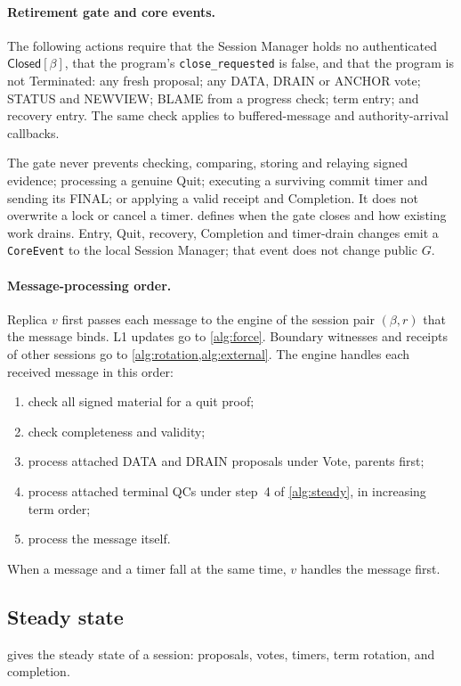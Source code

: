 \documentclass[11pt,a4paper]{article}
\newcommand{\RR}[1]{{\color{rrRed}#1}}
\newcommand{\tagg}[1]{\ensuremath{\mathsf{#1}}}
\begin{document}
\paragraph{Retirement gate and core events.}
The following actions require that the Session Manager holds no
authenticated $\tagg{Closed}[\beta]$, that the program's
\texttt{close\_requested} is false, and that the program is not
Terminated: any fresh proposal; any DATA, DRAIN or ANCHOR vote; STATUS
and NEWVIEW; BLAME from a progress check; term entry; and recovery entry.
The same check applies to buffered-message and authority-arrival
callbacks.

The gate never prevents checking, comparing, storing and relaying signed
evidence; processing a genuine Quit; executing a surviving commit timer
and sending its FINAL; or applying a valid receipt and Completion. It
does not overwrite a lock or cancel a timer. 
defines when the gate closes and how existing work drains. Entry, Quit,
recovery, Completion and timer-drain changes emit a \texttt{CoreEvent} to
the local Session Manager; that event does not change public $G$.

\paragraph{Message-processing order.}\leavevmode
\RR{Replica $v$ first passes each message to the engine of the session
pair $(\beta,r)$ that the message binds. L1 updates go to \cref{alg:force}. Boundary witnesses and receipts of
other sessions go to \cref{alg:rotation,alg:external}.} The engine handles each received
message in this order:
\begin{enumerate}[label=(\arabic*)]
\item check all signed material for a quit proof;
\item check completeness and validity;
\item process attached DATA \RR{and DRAIN} proposals under Vote, parents
first;
\item process attached terminal QCs under step~4 of \cref{alg:steady},
in increasing term order;
\item process the message itself.
\end{enumerate}
When a message and a timer fall at the same time, $v$ handles the
message first.

\subsection{Steady state}
\label{sec:steady}
 gives the steady state of a session: proposals, votes,
timers, term rotation, and completion.
\end{document}
